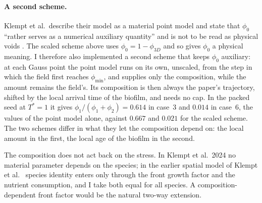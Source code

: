 {\paragraph{A second scheme.} Klempt et al.\ describe their model as a
material point model and state that $\phi_0$ ``rather serves as a numerical
auxiliary quantity'' and is not to be read as physical voids
\cite{Klempt2026ContinuumBacterialGrowth}. The scaled scheme above uses
$\phi_0=1-\phi_{3D}$ and so gives $\phi_0$ a physical meaning. I
therefore also implemented a second scheme that keeps $\phi_0$ auxiliary:
at each Gauss point the point model runs on its own, unscaled, from the step
in which the field first reaches $\phi_{\min}$, and supplies only the
composition, while the amount remains the field's. Its composition is then
always the paper's trajectory, shifted by the local arrival time of the
biofilm, and needs no cap. In the packed seed at $T^*=1$ it gives
$\phi_1/(\phi_1+\phi_2)=0.614$ in case~3 and $0.014$ in case~6, the values of the point model
alone, against $0.667$ and $0.021$ for the scaled scheme. The two schemes
differ in what they let the composition depend on: the local amount in the
first, the local age of the biofilm in the second.

The composition does not act back on the stress. In Klempt et al.\ 2024 no
material parameter depends on the species; in the earlier spatial model of
Klempt et al.~\cite{Klempt2023NumericalComparison} species identity enters only
through the front growth factor and the nutrient consumption, and I take both
equal for all species. A composition-dependent front factor would be the
natural two-way extension.}


